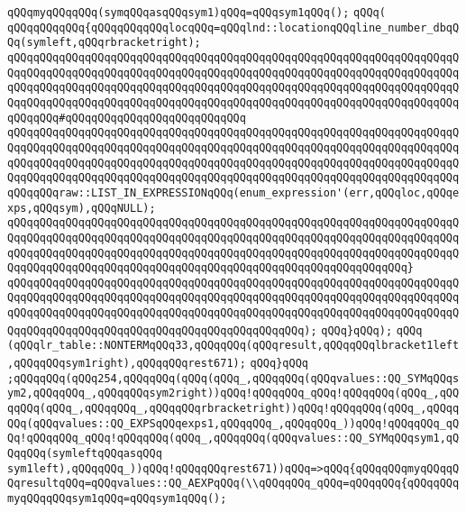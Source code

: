 \verb|qQQqmyqQQqqQQq(symqQQqasqQQqsym1)qQQq=qQQqsym1qQQq();|\newline
\verb|qQQq(|\newline
\verb|qQQqqQQqqQQq{qQQqqQQqqQQqlocqQQq=qQQqlnd::locationqQQqline_number_dbqQQq(symleft,qQQqrbracketright);|\newline
\verb|qQQqqQQqqQQqqQQqqQQqqQQqqQQqqQQqqQQqqQQqqQQqqQQqqQQqqQQqqQQqqQQqqQQqqQQqqQQqqQQqqQQqqQQqqQQqqQQqqQQqqQQqqQQqqQQqqQQqqQQqqQQqqQQqqQQqqQQqqQQqqQQqqQQqqQQqqQQqqQQqqQQqqQQqqQQqqQQqqQQqqQQqqQQqqQQqqQQqqQQqqQQqqQQqqQQqqQQqqQQqqQQqqQQqqQQqqQQqqQQqqQQqqQQqqQQqqQQqqQQqqQQqqQQqqQQqqQQqqQQqqQQqqQQq#qQQqqQQqqQQqqQQqqQQqqQQqqQQq|\newline
\verb|qQQqqQQqqQQqqQQqqQQqqQQqqQQqqQQqqQQqqQQqqQQqqQQqqQQqqQQqqQQqqQQqqQQqqQQqqQQqqQQqqQQqqQQqqQQqqQQqqQQqqQQqqQQqqQQqqQQqqQQqqQQqqQQqqQQqqQQqqQQqqQQqqQQqqQQqqQQqqQQqqQQqqQQqqQQqqQQqqQQqqQQqqQQqqQQqqQQqqQQqqQQqqQQqqQQqqQQqqQQqqQQqqQQqqQQqqQQqqQQqqQQqqQQqqQQqqQQqqQQqqQQqqQQqqQQqqQQqqQQqqQQqqQQqraw::LIST_IN_EXPRESSIONqQQq(enum_expression'(err,qQQqloc,qQQqexps,qQQqsym),qQQqNULL);|\newline
\verb|qQQqqQQqqQQqqQQqqQQqqQQqqQQqqQQqqQQqqQQqqQQqqQQqqQQqqQQqqQQqqQQqqQQqqQQqqQQqqQQqqQQqqQQqqQQqqQQqqQQqqQQqqQQqqQQqqQQqqQQqqQQqqQQqqQQqqQQqqQQqqQQqqQQqqQQqqQQqqQQqqQQqqQQqqQQqqQQqqQQqqQQqqQQqqQQqqQQqqQQqqQQqqQQqqQQqqQQqqQQqqQQqqQQqqQQqqQQqqQQqqQQqqQQqqQQqqQQqqQQqqQQqqQQqqQQq}|\newline
\verb|qQQqqQQqqQQqqQQqqQQqqQQqqQQqqQQqqQQqqQQqqQQqqQQqqQQqqQQqqQQqqQQqqQQqqQQqqQQqqQQqqQQqqQQqqQQqqQQqqQQqqQQqqQQqqQQqqQQqqQQqqQQqqQQqqQQqqQQqqQQqqQQqqQQqqQQqqQQqqQQqqQQqqQQqqQQqqQQqqQQqqQQqqQQqqQQqqQQqqQQqqQQqqQQqqQQqqQQqqQQqqQQqqQQqqQQqqQQqqQQqqQQqqQQqqQQqqQQq);|\newline
\verb|qQQq}qQQq);|\newline
\verb|qQQq|\newline
\verb|(qQQqlr_table::NONTERMqQQq33,qQQqqQQq(qQQqresult,qQQqqQQqlbracket1left,qQQqqQQqsym1right),qQQqqQQqrest671);|\newline
\verb|qQQq}qQQq|\newline
\verb|;qQQqqQQq(qQQq254,qQQqqQQq(qQQq(qQQq_,qQQqqQQq(qQQqvalues::QQ_SYMqQQqsym2,qQQqqQQq_,qQQqqQQqsym2right))qQQq!qQQqqQQq_qQQq!qQQqqQQq(qQQq_,qQQqqQQq(qQQq_,qQQqqQQq_,qQQqqQQqrbracketright))qQQq!qQQqqQQq(qQQq_,qQQqqQQq(qQQqvalues::QQ_EXPSqQQqexps1,qQQqqQQq_,qQQqqQQq_))qQQq!qQQqqQQq_qQQq!qQQqqQQq_qQQq!qQQqqQQq(qQQq_,qQQqqQQq(qQQqvalues::QQ_SYMqQQqsym1,qQQqqQQq(symleftqQQqasqQQq|\newline
\verb|sym1left),qQQqqQQq_))qQQq!qQQqqQQqrest671))qQQq=>qQQq{qQQqqQQqmyqQQqqQQqresultqQQq=qQQqvalues::QQ_AEXPqQQq(\\qQQqqQQq_qQQq=qQQqqQQq{qQQqqQQqmyqQQqqQQqsym1qQQq=qQQqsym1qQQq();|\newline
